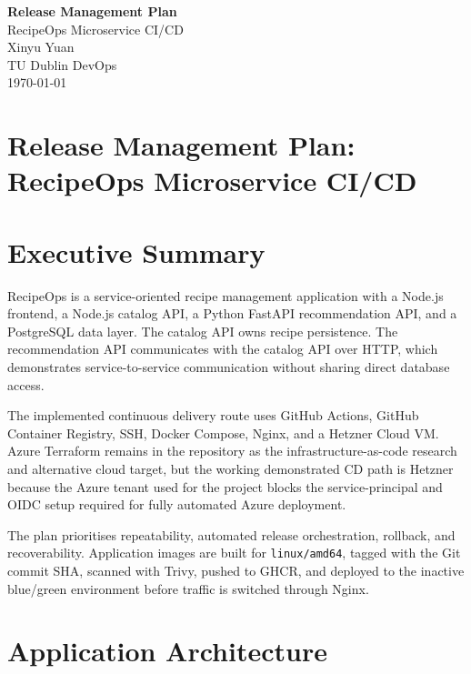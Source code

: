 \documentclass[11pt,a4paper]{article}
\begin{document}
\begin{titlepage}
  \centering
  \vspace*{2cm}
  {\Huge\bfseries Release Management Plan\\[0.35cm]}
  {\LARGE RecipeOps Microservice CI/CD\\[1.2cm]}
  {\large Xinyu Yuan\\[0.4cm]}
  {\large TU Dublin DevOps\\[2cm]}
  \vfill
  {\large \today}
\end{titlepage}
\tableofcontents
\newpage
\section*{Release Management Plan: RecipeOps Microservice CI/CD}

\section{Executive Summary}

RecipeOps is a service-oriented recipe management application with a Node.js frontend, a Node.js catalog API, a Python FastAPI recommendation API, and a PostgreSQL data layer. The catalog API owns recipe persistence. The recommendation API communicates with the catalog API over HTTP, which demonstrates service-to-service communication without sharing direct database access.

The implemented continuous delivery route uses GitHub Actions, GitHub Container Registry, SSH, Docker Compose, Nginx, and a Hetzner Cloud VM. Azure Terraform remains in the repository as the infrastructure-as-code research and alternative cloud target, but the working demonstrated CD path is Hetzner because the Azure tenant used for the project blocks the service-principal and OIDC setup required for fully automated Azure deployment.

The plan prioritises repeatability, automated release orchestration, rollback, and recoverability. Application images are built for \texttt{linux/amd64}, tagged with the Git commit SHA, scanned with Trivy, pushed to GHCR, and deployed to the inactive blue/green environment before traffic is switched through Nginx.

\section{Application Architecture}
\end{document}
